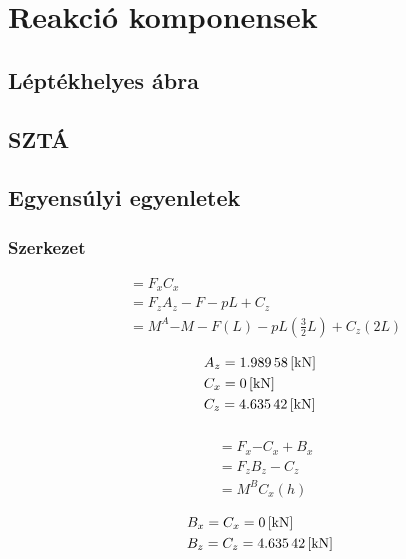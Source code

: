 \section{Reakció komponensek}

\subsection{Léptékhelyes ábra}

\subsection{SZTÁ}

\subsection{Egyensúlyi egyenletek}

\subsubsection{Szerkezet}
\begin{align*}
	&\equal{F_x}{C_x} \\
	&\equal{F_z}{A_z - F - pL + C_z} \\
	&\equal{M^A}{-M-F(L)-pL\left(\frac{3}{2}L\right)+C_z(2L)}
\end{align*}

\begin{align*}
	&A_z = \SI{1.98958}{[\kilo\newton]} \\
	&C_x = \SI{0}{[\kilo\newton]} \\
	&C_z = \SI{4.63542}{[\kilo\newton]} 
\end{align*}

\subsubsection{}
\begin{align*}
	&\equal{F_x}{-C_x+B_x} \\
	&\equal{F_z}{B_z - C_z} \\
	&\equal{M^B}{C_x(h)}
\end{align*}

\begin{align*}
	&B_x = C_x = \SI{0}{[\kilo\newton]} \\
	&B_z = C_z = \SI{4.63542}{[\kilo\newton]} 
\end{align*}
